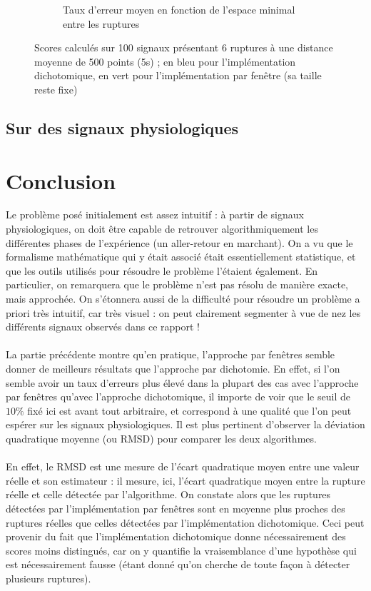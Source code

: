 \documentclass[french,11pt,notitlepage]{report}
\begin{document}
\begin{figure}[hp]
\begin{subfigure}[t]{.49\textwidth}
			\caption{Taux d'erreur moyen en fonction de l'espace minimal entre les ruptures}
			\label{}
		\end{subfigure}
	\caption{Scores calculés sur 100 signaux présentant 6 ruptures à une distance moyenne de 500 points (5s) ; en bleu pour l'implémentation dichotomique, en vert pour l'implémentation par fenêtre (sa taille reste fixe)}
	\label{score_min}
	\end{figure}
	
	
	\section{Sur des signaux physiologiques}
	
	
	
	\chapter{Conclusion}
	Le problème posé initialement est assez intuitif : à partir de signaux physiologiques, on doit être capable de retrouver algorithmiquement les différentes phases de l'expérience (un aller-retour en marchant). On a vu que le formalisme mathématique qui y était associé était essentiellement statistique, et que les outils utilisés pour résoudre le problème l'étaient également. En particulier, on remarquera que le problème n'est pas résolu de manière exacte, mais approchée. On s'étonnera aussi de la difficulté pour résoudre un problème a priori très intuitif, car très visuel : on peut clairement segmenter à vue de nez les différents signaux observés dans ce rapport !
	\\ \\
	La partie précédente montre qu'en pratique, l'approche par fenêtres semble donner de meilleurs résultats que l'approche par dichotomie. En effet, si l'on semble avoir un taux d'erreurs plus élevé dans la plupart des cas avec l'approche par fenêtres qu'avec l'approche dichotomique, il importe de voir que le seuil de $10\%$ fixé ici est avant tout arbitraire, et correspond à une qualité que l'on peut espérer sur les signaux physiologiques. Il est plus pertinent d'observer la déviation quadratique moyenne (ou RMSD) pour comparer les deux algorithmes.
	\\ \\
	En effet, le RMSD est une mesure de l'écart quadratique moyen entre une valeur réelle et son estimateur : il mesure, ici, l'écart quadratique moyen entre la rupture réelle et celle détectée par l'algorithme. On constate alors que les ruptures détectées par l'implémentation par fenêtres sont en moyenne plus proches des ruptures réelles que celles détectées par l'implémentation dichotomique. Ceci peut provenir du fait que l'implémentation dichotomique donne nécessairement des scores moins distingués, car on y quantifie la vraisemblance d'une hypothèse qui est nécessairement fausse (étant donné qu'on cherche de toute façon à détecter plusieurs ruptures).
	


	
\end{document}
